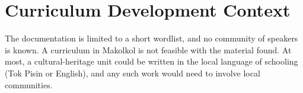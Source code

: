 \documentclass[12pt]{article}
\begin{document}
\section{Curriculum Development Context}
The documentation is limited to a short wordlist, and no community of speakers is known. A curriculum in Makolkol is not feasible with the material found. At most, a cultural-heritage unit could be written in the local language of schooling (Tok Pisin or English), and any such work would need to involve local communities.
\end{document}
